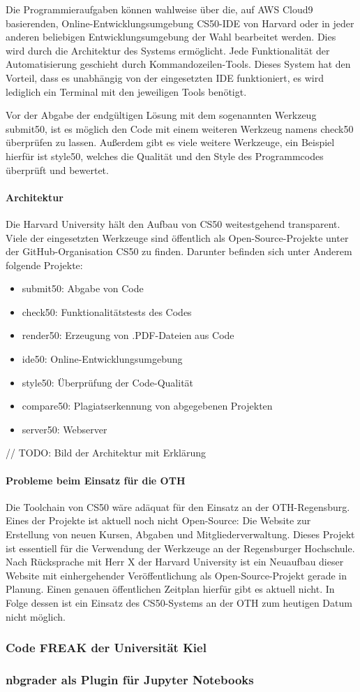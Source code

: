 Die Programmieraufgaben können wahlweise über die, auf AWS Cloud9 basierenden,
Online-Entwicklungsumgebung \glqq CS50-IDE\grqq{} von Harvard oder in jeder
anderen beliebigen Entwicklungsumgebung der Wahl bearbeitet werden. Dies
wird durch die Architektur des Systems ermöglicht. Jede Funktionalität der
Automatisierung geschieht durch Kommandozeilen-Tools. Dieses System hat den
Vorteil, dass es unabhängig von der eingesetzten IDE funktioniert, es wird
lediglich ein Terminal mit den jeweiligen Tools benötigt.

Vor der Abgabe der endgültigen Lösung mit dem sogenannten Werkzeug
\glqq submit50\grqq{}, ist es möglich den Code mit einem weiteren Werkzeug
namens \glqq check50\grqq{} überprüfen zu lassen. Außerdem gibt es viele weitere
Werkzeuge, ein Beispiel hierfür ist \glqq style50\grqq{}, welches die Qualität
und den Style des Programmcodes überprüft und bewertet.

\paragraph{Architektur}
Die Harvard University hält den Aufbau von CS50 weitestgehend transparent.
Viele der eingesetzten Werkzeuge sind öffentlich als Open-Source-Projekte unter
der GitHub-Organisation \glqq CS50\grqq{} zu finden. Darunter befinden sich
unter Anderem folgende Projekte:
\begin{itemize}
\item submit50: Abgabe von Code
\item check50: Funktionalitätstests des Codes
\item render50: Erzeugung von .PDF-Dateien aus Code
\item ide50: Online-Entwicklungsumgebung
\item style50: Überprüfung der Code-Qualität
\item compare50: Plagiatserkennung von abgegebenen Projekten
\item server50: Webserver
\end{itemize}

// TODO: Bild der Architektur mit Erklärung

\paragraph{Probleme beim Einsatz für die OTH}
Die Toolchain von CS50 wäre adäquat für den Einsatz an der OTH-Regensburg.
Eines der Projekte ist aktuell noch nicht Open-Source: Die Website zur
Erstellung von neuen Kursen, Abgaben und Mitgliederverwaltung. Dieses Projekt
ist essentiell für die Verwendung der Werkzeuge an der Regensburger Hochschule.
Nach Rücksprache mit Herr X der Harvard University ist ein Neuaufbau dieser
Website mit einhergehender Veröffentlichung als Open-Source-Projekt gerade in
Planung. Einen genauen öffentlichen Zeitplan hierfür gibt es aktuell nicht. In
Folge dessen ist ein Einsatz des CS50-Systems an der OTH zum heutigen Datum
nicht möglich.

\subsubsection{Code FREAK der Universität Kiel}
\subsubsection{nbgrader als Plugin für Jupyter Notebooks}
